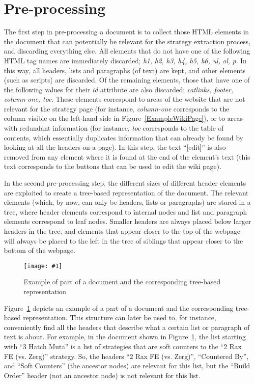\documentclass[]{article}
\newcommand{\insertfigure}[3]{ 
	\begin{figure}[#3]
	\begin{center}
	\texttt{[image: \#1]}
	\caption{#2}
	\label{#1}
	\end{center}
	\end{figure}
}
\newcommand{\reffigure}[1]{Figure~\ref{#1}}
\begin{document}
\section{Pre-processing} \label{SecPreProcessing}
The first step in pre-processing a document is to collect those HTML elements in the document that can potentially be relevant for the strategy extraction process, and discarding everything else. All elements that do not have one of the following HTML tag names are immediately discarded; \emph{h1, h2, h3, h4, h5, h6, ul, ol, p}. In this way, all headers, lists and paragraphs (of text) are kept, and other elements (such as scripts) are discarded. Of the remaining elements, those that have one of the following values for their \emph{id} attribute are also discarded; \emph{catlinks, footer, column-one, toc}. These elements correspond to areas of the website that are not relevant for the strategy page (for instance, \emph{column-one} corresponds to the column visible on the left-hand side in \reffigure{ExampleWikiPage}), or to areas with redundant information (for instance, \emph{toc} corresponds to the table of contents, which essentially duplicates information that can already be found by looking at all the headers on a page). In this step, the text ``[edit]'' is also removed from any element where it is found at the end of the element's text (this text corresponds to the buttons that can be used to edit the wiki page).

In the second pre-processing step, the different sizes of different header elements are exploited to create a tree-based representation of the document. The relevant elements (which, by now, can only be headers, lists or paragraphs) are stored in a tree, where header elements correspond to internal nodes and list and paragraph elements correspond to leaf nodes. Smaller headers are always placed below larger headers in the tree, and elements that appear closer to the top of the webpage will always be placed to the left in the tree of siblings that appear closer to the bottom of the webpage. 
\insertfigure{ExampleDocumentTree}{Example of part of a document and the corresponding tree-based representation}{h} 
\reffigure{ExampleDocumentTree} depicts an example of a part of a document and the corresponding tree-based representation. This structure can later be used to, for instance, conveniently find all the headers that describe what a certain list or paragraph of text is about. For example, in the document shown in \reffigure{ExampleDocumentTree}, the list starting with ``3 Hatch Muta'' is a list of strategies that are soft counters to the ``2 Rax FE (vs. Zerg)'' strategy. So, the headers ``2 Rax FE (vs. Zerg)'', ``Countered By'', and ``Soft Counters'' (the ancestor nodes) are relevant for this list, but the ``Build Order'' header (not an ancestor node) is not relevant for this list.
\end{document}
